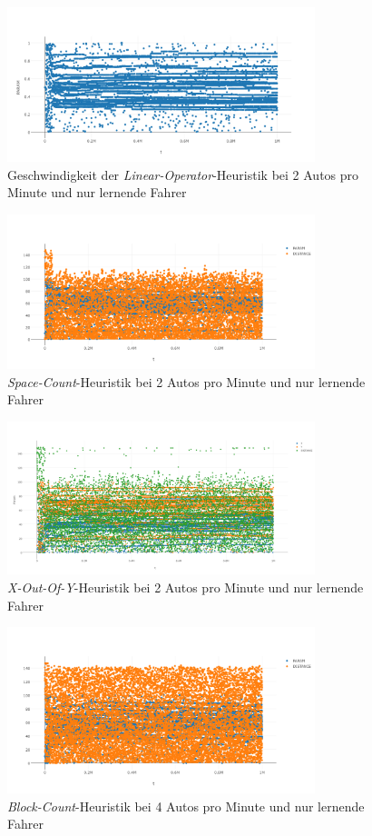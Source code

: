 \begin{figure}[H]
	\includegraphics[width=0.8\textwidth]{analyse/JustHeuristik/2pm/linopa2just.png}
	\caption{Geschwindigkeit der \emph{Linear-Operator}-Heuristik bei 2 Autos pro Minute und nur lernende Fahrer}\label{fig:ap_jh_loa_2}
\end{figure}
\begin{figure}[H]
	\includegraphics[width=0.8\textwidth]{analyse/JustHeuristik/2pm/space2just.png}
	\caption{\emph{Space-Count}-Heuristik bei 2 Autos pro Minute und nur lernende Fahrer}\label{fig:ap_jh_sc_2}
\end{figure}
\begin{figure}[H]
	\includegraphics[width=0.8\textwidth]{analyse/JustHeuristik/2pm/xy.png}
	\caption{\emph{X-Out-Of-Y}-Heuristik bei 2 Autos pro Minute und nur lernende Fahrer}\label{fig:ap_jh_xy_2}
\end{figure}
\begin{figure}[H]
	\includegraphics[width=0.8\textwidth]{analyse/JustHeuristik/4pm/block4just.png}
	\caption{\emph{Block-Count}-Heuristik bei 4 Autos pro Minute und nur lernende Fahrer}\label{fig:ap_jh_bs_4}
\end{figure}
